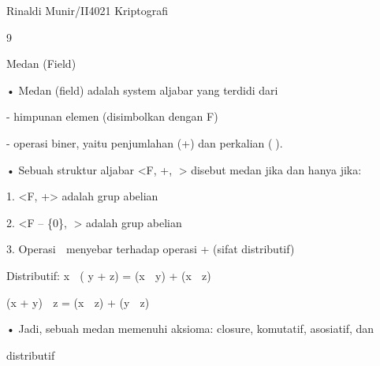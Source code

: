 \documentclass{article}
\begin{document}

Rinaldi Munir/II4021 Kriptografi

9

Medan (Field)

• Medan (field) adalah system aljabar yang terdidi dari


- himpunan elemen (disimbolkan dengan F) 


- operasi biner, yaitu penjumlahan (+) dan perkalian ().

• Sebuah struktur aljabar <F, +, > disebut medan jika dan hanya jika:

 1. <F, +> adalah grup abelian

 2. <F – \{0\}, > adalah grup abelian

 3. Operasi  menyebar terhadap operasi +  (sifat distributif)

     Distributif: x  ( y + z) = (x  y) + (x  z)



(x + y)  z  = (x  z) + (y  z)

• Jadi, sebuah medan memenuhi aksioma: closure, komutatif, asosiatif, dan 

distributif
\end{document}

